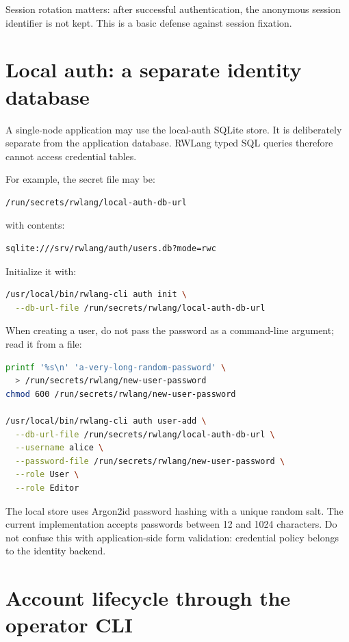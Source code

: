 Session rotation matters: after successful authentication, the anonymous session identifier is not kept. This is a basic defense against session fixation.

\section{Local auth: a separate identity database}

A single-node application may use the local-auth SQLite store. It is deliberately separate from the application database. RWLang typed SQL queries therefore cannot access credential tables.

For example, the secret file may be:

\begin{lstlisting}
/run/secrets/rwlang/local-auth-db-url
\end{lstlisting}

with contents:

\begin{lstlisting}
sqlite:///srv/rwlang/auth/users.db?mode=rwc
\end{lstlisting}

Initialize it with:

\begin{lstlisting}[language=bash]
/usr/local/bin/rwlang-cli auth init \
  --db-url-file /run/secrets/rwlang/local-auth-db-url
\end{lstlisting}

When creating a user, do not pass the password as a command-line argument; read it from a file:

\begin{lstlisting}[language=bash]
printf '%s\n' 'a-very-long-random-password' \
  > /run/secrets/rwlang/new-user-password
chmod 600 /run/secrets/rwlang/new-user-password

/usr/local/bin/rwlang-cli auth user-add \
  --db-url-file /run/secrets/rwlang/local-auth-db-url \
  --username alice \
  --password-file /run/secrets/rwlang/new-user-password \
  --role User \
  --role Editor
\end{lstlisting}

The local store uses Argon2id password hashing with a unique random salt. The current implementation accepts passwords between 12 and 1024 characters. Do not confuse this with application-side form validation: credential policy belongs to the identity backend.

\section{Account lifecycle through the operator CLI}

